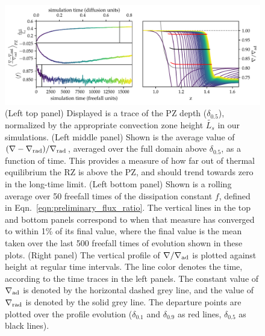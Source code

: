 \documentclass{aastex631}
\newcommand{\gradrad}{\ensuremath{\nabla_{\rm{rad}}}}
\newcommand{\gradad}{\ensuremath{\nabla_{\rm{ad}}}}
\newcommand{\justgrad}{\ensuremath{\nabla}}
\begin{document}
\begin{figure}[t!]
\centering
\includegraphics[width=\textwidth]{time_evolution.pdf}
\caption{
(Left top panel) Displayed is a trace of the PZ depth ($\delta_{0.5}$), normalized by the appropriate convection zone height $\tilde{L_s}$ in our simulations.
(Left middle panel) Shown is the average value of $(\justgrad - \gradrad)/\gradrad$, averaged over the full domain above $\delta_{0.5}$, as a function of time.
This provides a measure of how far out of thermal equilibrium the RZ is above the PZ, and should trend towards zero in the long-time limit.
(Left bottom panel) Shown is a rolling average over 50 freefall times of the dissipation constant $f$, defined in Eqn.~\ref{eqn:preliminary_flux_ratio}.
The vertical lines in the top and bottom panels correspond to when that measure has converged to within 1\% of its final value, where the final value is the mean taken over the last 500 freefall times of evolution shown in these plots.
(Right panel) The vertical profile of $\justgrad/\gradad$ is plotted against height at regular time intervals.
The line color denotes the time, according to the time traces in the left panels.
The constant value of $\gradad$ is denoted by the horizontal dashed grey line, and the value of $\gradrad$ is denoted by the solid grey line.
The departure points are plotted over the profile evolution ($\delta_{0.1}$ and $\delta_{0.9}$ as red lines, $\delta_{0.5}$ as black lines).
\label{fig:time_evolution}
}
\end{figure}
\end{document}
